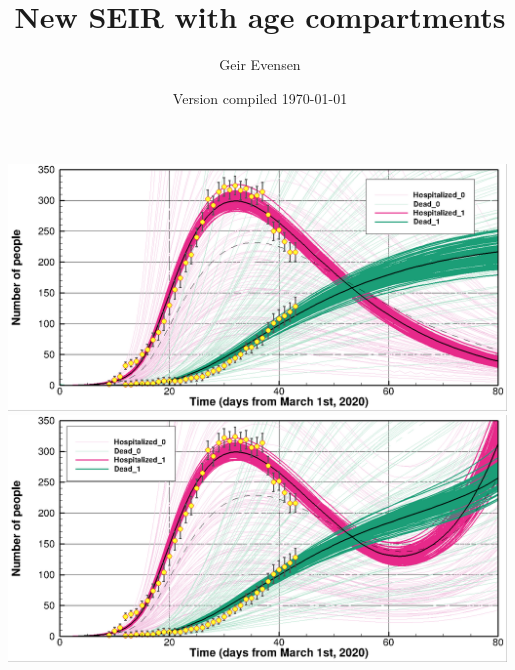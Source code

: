 \documentclass[twoside,11pt]{article}
\begin{document}
\setlength{\parskip}{3mm} 

\title{New SEIR with age compartments }
\author{Geir Evensen}

\date{Version compiled \today}

\maketitle


\begin{center}
\includegraphics[width=0.99\textwidth]{closed.png} \\
\includegraphics[width=0.99\textwidth]{closed1.png} 
\end{center}

\newpage
\end{document}
